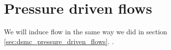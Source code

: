 \section{Pressure driven flows}
\label{md:pressure_driven_flows}
We will induce flow in the same way we did in section \ref{sec:dsmc_pressure_driven_flows}. .